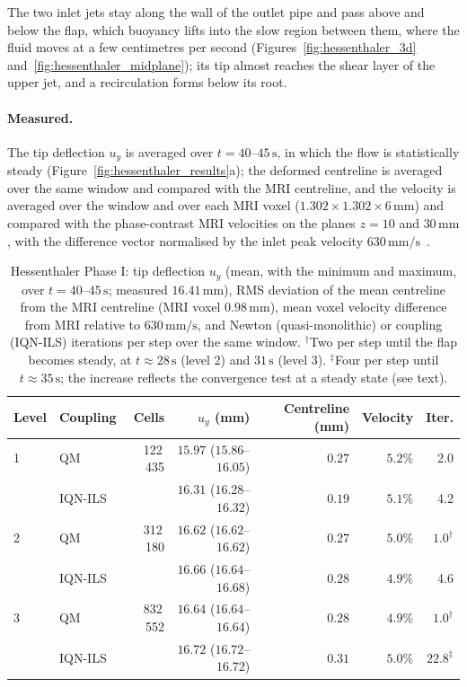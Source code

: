 The two inlet jets stay along the wall of the outlet pipe and pass above and below the flap, which buoyancy lifts into the slow region between them, where the fluid moves at a few centimetres per second (Figures~\ref{fig:hessenthaler_3d} and~\ref{fig:hessenthaler_midplane}); its tip almost reaches the shear layer of the upper jet, and a recirculation forms below its root.

\paragraph{Measured.}
The tip deflection $u_y$ is averaged over $t = 40$--$45\,\mathrm{s}$, in which the flow is statistically steady (Figure~\ref{fig:hessenthaler_results}a); the deformed centreline is averaged over the same window and compared with the MRI centreline, and the velocity is averaged over the window and over each MRI voxel ($1.302\times1.302\times6\,\mathrm{mm}$) and compared with the phase-contrast MRI velocities on the planes $z = 10$ and $30\,\mathrm{mm}$, with the difference vector normalised by the inlet peak velocity $630\,\mathrm{mm/s}$~\citep{Hessenthaler2017a}.

\begin{table}[htbp]
	\centering
	\footnotesize
	\setlength{\tabcolsep}{3pt}
	\caption{Hessenthaler Phase I: tip deflection $u_y$ (mean, with the minimum and maximum, over $t = 40$--$45\,\mathrm{s}$; measured $16.41\,\mathrm{mm}$), RMS deviation of the mean centreline from the MRI centreline (MRI voxel $0.98\,\mathrm{mm}$), mean voxel velocity difference from MRI relative to $630\,\mathrm{mm/s}$, and Newton (quasi-monolithic) or coupling (IQN-ILS) iterations per step over the same window. ${}^{\dagger}$Two per step until the flap becomes steady, at $t \approx 28\,\mathrm{s}$ (level 2) and $31\,\mathrm{s}$ (level 3). ${}^{\ddagger}$Four per step until $t \approx 35\,\mathrm{s}$; the increase reflects the convergence test at a steady state (see text).}
	\label{tab:hessenthaler_m}
	\begin{tabular}{llrrrrr}
		\toprule
		Level & Coupling & Cells & $u_y$ (mm) & Centreline (mm) & Velocity & Iter. \\
		\midrule
		1 & QM      & 122\,435 & $15.97$ ($15.86$--$16.05$) & $0.27$ & $5.2\%$ & 2.0 \\
		    & IQN-ILS &          & $16.31$ ($16.28$--$16.32$) & $0.19$ & $5.1\%$ & 4.2 \\
		2 & QM      & 312\,180 & $16.62$ ($16.62$--$16.62$) & $0.27$ & $5.0\%$ & $1.0^{\dagger}$ \\
		    & IQN-ILS &          & $16.66$ ($16.64$--$16.68$) & $0.28$ & $4.9\%$ & 4.6 \\
		3 & QM      & 832\,552 & $16.64$ ($16.64$--$16.64$) & $0.28$ & $4.9\%$ & $1.0^{\dagger}$ \\
		    & IQN-ILS &          & $16.72$ ($16.72$--$16.72$) & $0.31$ & $5.0\%$ & $22.8^{\ddagger}$ \\
		\bottomrule
	\end{tabular}
\end{table}

